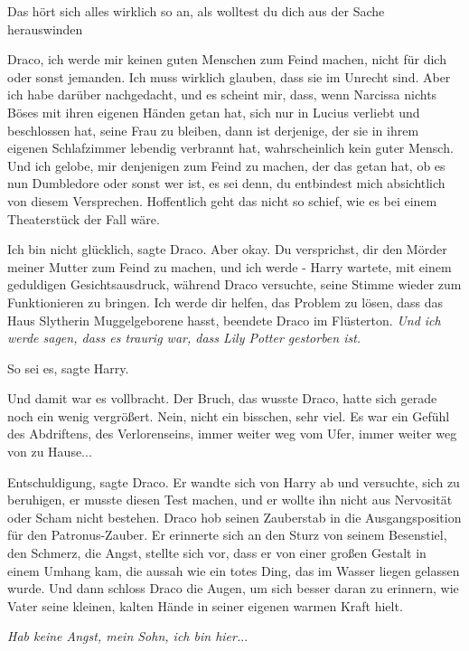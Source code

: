 \glqq{}Das hört sich alles wirklich so an, als wolltest du dich aus der Sache
herauswinden\grqq{}

\glqq{}Draco, ich werde mir keinen guten Menschen zum Feind machen, nicht für
dich oder sonst jemanden. Ich muss wirklich glauben, dass sie im Unrecht sind.
Aber ich habe darüber nachgedacht, und es scheint mir, dass, wenn Narcissa
nichts Böses mit ihren eigenen Händen getan hat, sich nur in Lucius verliebt und
beschlossen hat, seine Frau zu bleiben, dann ist derjenige, der sie in ihrem
eigenen Schlafzimmer lebendig verbrannt hat, wahrscheinlich kein guter Mensch.
Und ich gelobe, mir denjenigen zum Feind zu machen, der das getan hat, ob es nun
Dumbledore oder sonst wer ist, es sei denn, du entbindest mich absichtlich von
diesem Versprechen. Hoffentlich geht das nicht so schief, wie es bei einem
Theaterstück der Fall wäre.\grqq{}

\glqq{}Ich bin nicht glücklich\grqq{}, sagte Draco. \glqq{}Aber okay. Du
versprichst, dir den Mörder meiner Mutter zum Feind zu machen, und ich werde
-\grqq{} Harry wartete, mit einem geduldigen Gesichtsausdruck, während Draco
versuchte, seine Stimme wieder zum Funktionieren zu bringen. \glqq{}Ich werde dir
helfen, das Problem zu lösen, dass das Haus Slytherin Muggelgeborene
hasst\grqq{}, beendete Draco im Flüsterton. \glqq{}\emph{Und ich werde sagen,
dass es traurig war, dass Lily Potter gestorben ist.}\grqq{}

\glqq{}So sei es\grqq{}, sagte Harry.

Und damit war es vollbracht. Der Bruch, das wusste Draco, hatte sich gerade noch
ein wenig vergrößert. Nein, nicht ein bisschen, sehr viel. Es war ein Gefühl des
Abdriftens, des Verlorenseins, immer weiter weg vom Ufer, immer weiter weg von
zu Hause...

\glqq{}Entschuldigung\grqq{}, sagte Draco. Er wandte sich von Harry ab und
versuchte, sich zu beruhigen, er musste diesen Test machen, und er wollte ihn
nicht aus Nervosität oder Scham nicht bestehen. Draco hob seinen Zauberstab in
die Ausgangsposition für den Patronus-Zauber. Er erinnerte sich an den Sturz von
seinem Besenstiel, den Schmerz, die Angst, stellte sich vor, dass er von einer
großen Gestalt in einem Umhang kam, die aussah wie ein totes Ding, das im Wasser
liegen gelassen wurde. Und dann schloss Draco die Augen, um sich besser daran zu
erinnern, wie Vater seine kleinen, kalten Hände in seiner eigenen warmen Kraft
hielt.

\emph{Hab keine Angst, mein Sohn, ich bin hier.}..

